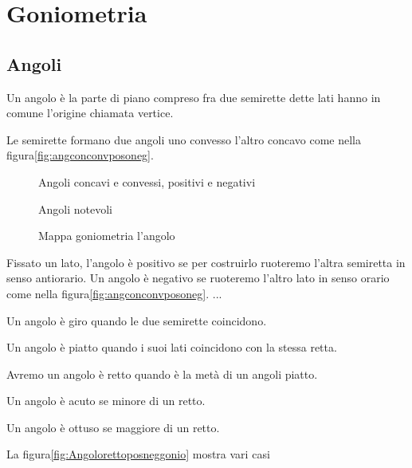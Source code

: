 \chapter{Goniometria}
\label{sec:GONIOMETRIA}
\minitoc
\mtcskip                                %
\minilof                                %
\mtcskip                                %
\minilot
\FloatBarrier
\section{Angoli}
\label{sec:gonioang}
\begin{definizione}[Angolo]
Un angolo è la parte di piano compreso fra due semirette dette lati hanno in comune l'origine chiamata vertice.
\end{definizione}

Le  semirette formano due angoli  uno convesso l'altro concavo come nella figura\nobs\vref{fig:angconconvposoneg}. 
\begin{figure} %
	\centering

	\caption{Angoli concavi e convessi, positivi e negativi}
	\label{fig:angconconvposoneg}
\end{figure}
\begin{figure} %
	\centering

	\caption{Angoli notevoli}
	\label{fig:Angolorettoposneggonio}
\end{figure}
\begin{figure}

	\caption{Mappa goniometria l'angolo}
	\label{fig:MappaGonometria1}
\end{figure}
\begin{definizione}
	Fissato un lato, l'angolo è  positivo  se per costruirlo ruoteremo l'altra semiretta in senso antiorario.  Un angolo è negativo se ruoteremo l'altro lato in senso orario come nella figura\nobs\vref{fig:angconconvposoneg}. ...
\end{definizione}
\begin{definizione}
Un angolo è giro quando le due semirette coincidono. 
\end{definizione}
\begin{definizione}
Un angolo è  piatto quando i suoi lati  coincidono con la stessa retta.
\end{definizione}
\begin{definizione}
Avremo un angolo è retto quando è la metà di un angoli piatto. 
\end{definizione}
\begin{definizione}
Un angolo è acuto se  minore di un  retto.
\end{definizione}
\begin{definizione}
Un angolo è ottuso se  maggiore di un  retto.
\end{definizione}
 La figura\nobs\vref{fig:Angolorettoposneggonio} mostra  vari casi
